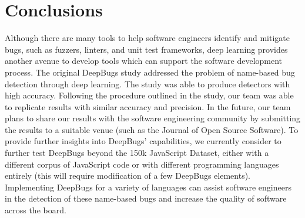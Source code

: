 \section{Conclusions}
Although there are many tools to help software engineers identify and mitigate bugs, such as fuzzers, linters, and unit test frameworks, deep learning provides another avenue to develop tools which can support the software development process. The original DeepBugs study addressed the problem of name-based bug detection through deep learning. The study was able to produce detectors with high accuracy. Following the procedure outlined in the study, our team was able to replicate results with similar accuracy and precision. In the future, our team plans to share our results with the software engineering community by submitting the results to a suitable venue (such as the Journal of Open Source Software). To provide further insights into DeepBugs' capabilities, we currently consider to further test DeepBugs beyond the 150k JavaScript Dataset, either with a different corpus of JavaScript code or with different programming languages entirely (this will require modification of a few DeepBugs elements). Implementing DeepBugs for a variety of languages can assist software engineers in the detection of these name-based bugs and increase the quality of software across the board.



